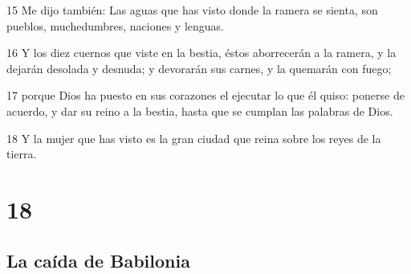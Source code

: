 \par 15 Me dijo también: Las aguas que has visto donde la ramera se sienta, son pueblos, muchedumbres, naciones y lenguas.
\par 16 Y los diez cuernos que viste en la bestia, éstos aborrecerán a la ramera, y la dejarán desolada y desnuda; y devorarán sus carnes, y la quemarán con fuego;
\par 17 porque Dios ha puesto en sus corazones el ejecutar lo que él quiso: ponerse de acuerdo, y dar su reino a la bestia, hasta que se cumplan las palabras de Dios.
\par 18 Y la mujer que has visto es la gran ciudad que reina sobre los reyes de la tierra.

\chapter{18}

\section*{La caída de Babilonia}

